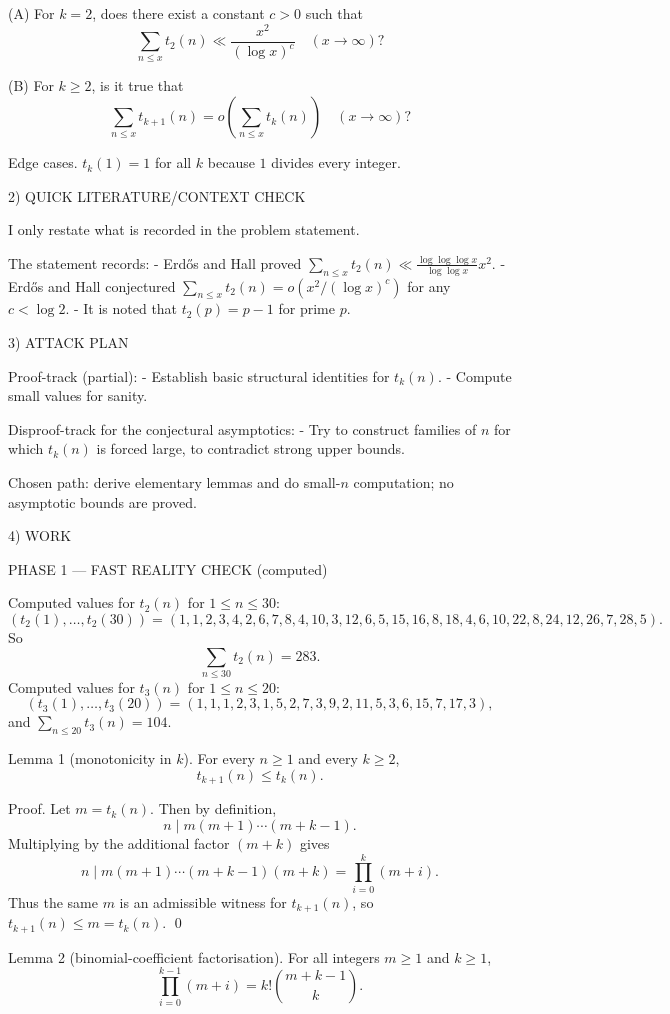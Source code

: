 (A) For $k=2$, does there exist a constant $c>0$ such that
\[
\sum_{n\le x} t_2(n) \ll \frac{x^2}{(\log x)^c}\quad (x\to\infty)?
\]

(B) For $k\ge 2$, is it true that
\[
\sum_{n\le x} t_{k+1}(n) = o\!\left(\sum_{n\le x} t_k(n)\right)\quad (x\to\infty)?
\]

Edge cases.
$t_k(1)=1$ for all $k$ because $1$ divides every integer.

2) QUICK LITERATURE/CONTEXT CHECK

I only restate what is recorded in the problem statement.

The statement records:
- Erd\H{o}s and Hall proved $\sum_{n\le x} t_2(n)\ll \frac{\log\log\log x}{\log\log x}x^2$.
- Erd\H{o}s and Hall conjectured $\sum_{n\le x} t_2(n)=o(x^2/(\log x)^c)$ for any $c<\log 2$.
- It is noted that $t_2(p)=p-1$ for prime $p$.

3) ATTACK PLAN

Proof-track (partial):
- Establish basic structural identities for $t_k(n)$.
- Compute small values for sanity.

Disproof-track for the conjectural asymptotics:
- Try to construct families of $n$ for which $t_k(n)$ is forced large, to contradict strong upper bounds.

Chosen path: derive elementary lemmas and do small-$n$ computation; no asymptotic bounds are proved.

4) WORK

PHASE 1 — FAST REALITY CHECK (computed)

Computed values for $t_2(n)$ for $1\le n\le 30$:
\[
( t_2(1),\dots,t_2(30))=(1,1,2,3,4,2,6,7,8,4,10,3,12,6,5,15,16,8,18,4,6,10,22,8,24,12,26,7,28,5).
\]
So
\[
\sum_{n\le 30} t_2(n)=283.
\]
Computed values for $t_3(n)$ for $1\le n\le 20$:
\[
( t_3(1),\dots,t_3(20))=(1,1,1,2,3,1,5,2,7,3,9,2,11,5,3,6,15,7,17,3),
\]
and $\sum_{n\le 20} t_3(n)=104$.

Lemma 1 (monotonicity in $k$).
For every $n\ge 1$ and every $k\ge 2$,
\[
 t_{k+1}(n)\le t_k(n).
\]

Proof.
Let $m=t_k(n)$. Then by definition,
\[
 n\mid m(m+1)\cdots(m+k-1).
\]
Multiplying by the additional factor $(m+k)$ gives
\[
 n\mid m(m+1)\cdots(m+k-1)(m+k)=\prod_{i=0}^{k} (m+i).
\]
Thus the same $m$ is an admissible witness for $t_{k+1}(n)$, so $t_{k+1}(n)\le m=t_k(n)$. \qed

Lemma 2 (binomial-coefficient factorisation).
For all integers $m\ge 1$ and $k\ge 1$,
\[
\prod_{i=0}^{k-1}(m+i)=k!\binom{m+k-1}{k}.
\]

